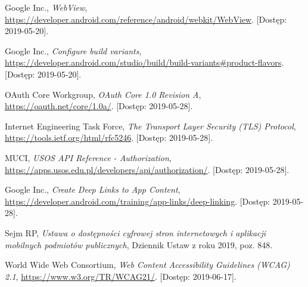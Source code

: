\documentclass{pracamgr}
\begin{document}
\begin{thebibliography}{99}
 Google Inc., \textit{WebView}, \url{https://developer.android.com/reference/android/webkit/WebView}. [Dostęp: 2019-05-20].

 Google Inc., \textit{Configure build variants}, \url{https://developer.android.com/studio/build/build-variants#product-flavors}. [Dostęp: 2019-05-20].

 OAuth Core Workgroup, \textit{OAuth Core 1.0 Revision A}, \url{https://oauth.net/core/1.0a/}. [Dostęp: 2019-05-28].

 Internet Engineering Task Force, \textit{The Transport Layer Security (TLS) Protocol}, \url{https://tools.ietf.org/html/rfc5246}. [Dostęp: 2019-05-28].

 MUCI, \textit{USOS API Reference - Authorization}, \url{https://apps.usos.edu.pl/developers/api/authorization/}. [Dostęp: 2019-05-28].

 Google Inc., \textit{Create Deep Links to App Content}, \url{https://developer.android.com/training/app-links/deep-linking}. [Dostęp: 2019-05-28].

 Sejm RP, \textit{Ustawa o dostępności cyfrowej stron internetowych i aplikacji mobilnych podmiotów publicznych}, Dziennik Ustaw z roku 2019, poz. 848.

 World Wide Web Consortium, \textit{Web Content Accessibility Guidelines (WCAG) 2.1},
\url{https://www.w3.org/TR/WCAG21/}. [Dostęp: 2019-06-17].

\end{thebibliography}
\end{document}
